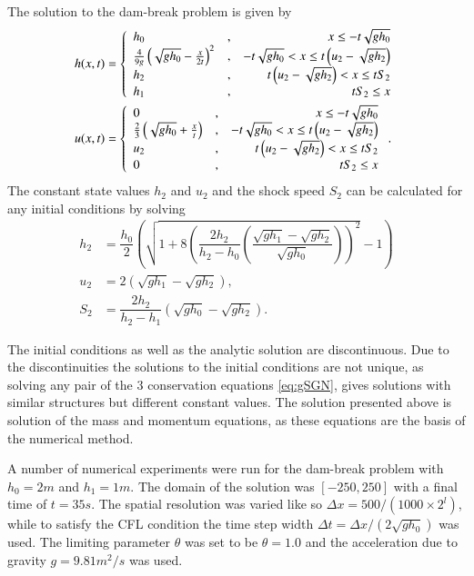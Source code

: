 \documentclass[10pt]{elsarticle}
\begin{document}
The solution to the dam-break problem is given by
\begin{align}
h(x,t) &= \left \lbrace \begin{array}{l c r}
h_0 &,& x \le -t\sqrt{g h_0} \\
\frac{4}{9g} \left(\sqrt{gh_0} - \frac{x}{2t}\right)^2 &,&  -t\sqrt{g h_0} < x \le t \left(u_2 - \sqrt{g h_2}\right)  \\
h_2 &,&  t \left(u_2 - \sqrt{g h_2}\right) < x \le t S_2  \\
h_1 &,&   t S_2 \le x \\
\end{array} \right.  \\
u(x,t) &= \left \lbrace \begin{array}{l c r}
0 &,& x \le -t\sqrt{g h_0} \\
\frac{2}{3} \left(\sqrt{gh_0} + \frac{x}{t}\right) &,&  -t\sqrt{g h_0} < x \le t \left(u_2 - \sqrt{g h_2}\right)  \\
u_2 &,&  t \left(u_2 - \sqrt{g h_2}\right) < x \le t S_2  \\
0 &,&   t S_2 \le x \\
\end{array} \right. .
\end{align}
%
The constant state values $h_2$ and $u_2$ and the shock speed $S_2$ can be calculated for any initial conditions by solving
\begin{align}
\label{eq:SWWEMiddleState}
h_2 &= \dfrac{h_0}{2} \left(  \sqrt{1 + 8 \left( \dfrac{2 h_2}{h_2 - h_0} \left(\dfrac{\sqrt{gh_1} - \sqrt{gh_2}}{\sqrt{gh_0}}\right)\right)^2 } - 1 \right) \\
u_2 &= 2\left(\sqrt{gh_1} - \sqrt{gh_2} \right),\\
S_2 &= \dfrac{2 h_2}{h_2 - h_1}\left(\sqrt{gh_0} - \sqrt{gh_2} \right).
\end{align}

The initial conditions as well as the analytic solution are discontinuous. Due to the discontinuities the solutions to the initial conditions are not unique, as solving any pair of the 3 conservation equations \eqref{eq:gSGN}, gives solutions with similar structures but different constant values. The solution presented above is solution of the mass and momentum equations, as these equations are the basis of the numerical method.

A number of numerical experiments were run for the dam-break problem with $h_0 = 2m$ and $h_1 = 1m$. The domain of the solution was $\left[-250,250\right]$ with a final time of $t=35s$.  The spatial resolution was varied like so $\Delta x = 500 / (1000 \times 2^{l})$, while to satisfy the CFL condition \cite{Lax-Richtmyer-1956-267} the time step width $\Delta t = \Delta x  / \left( 2 \sqrt{g h_0}\right)$ was used. The limiting parameter $\theta$ was set to be $\theta = 1.0$ and the acceleration due to gravity $g = 9.81 m^2/s$ was used. 
\end{document}
